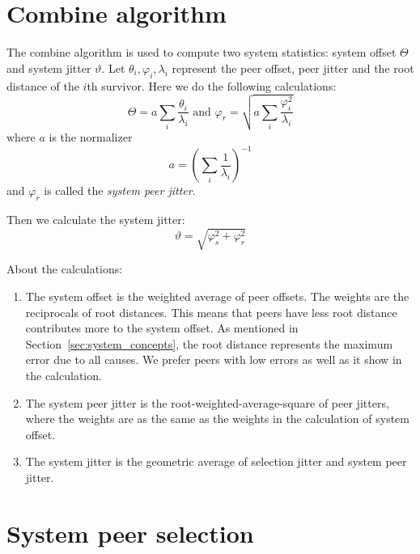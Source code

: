 \section{Combine algorithm}%
\label{sec:combine_algorithm}
The combine algorithm is used to compute two system statistics: system offset 
$\Theta$ and system jitter $\vartheta$. Let $\theta_i, \varphi_i, \lambda_i$
represent the peer offset, peer jitter and the root distance of the $i$th
survivor. Here we do the following calculations:~\cite{redbook}
\begin{equation}
    \Theta = a \sum^{}_{i} \frac{\theta_i}{\lambda_i} \text{ and } 
    \varphi_r = \sqrt{a \sum^{}_{i} \frac{\varphi_i ^ 2}{\lambda_i}}
    \label{eq:system_offset_selection_jitter}
\end{equation}
where $a$ is the normalizer
\begin{equation}
    a = \left( \sum^{}_{i} \frac{1}{\lambda_i} \right) ^ {-1}
    \label{eq:normalizer}
\end{equation}
and $\varphi_r$ is called the \emph{system peer jitter}.~\cite{rfc5905}

Then we calculate the system jitter:~\cite{redbook}
\begin{equation}
    \vartheta = \sqrt{\varphi_s^2 + \varphi_r^2}
    \label{eq:system_jitter}
\end{equation}

About the calculations:
\begin{enumerate}
    \item The system offset is the weighted average of peer offsets. The
        weights are the reciprocals of root distances. This means that peers
        have less root distance contributes more to the system offset. As
        mentioned in Section~\ref{sec:system_concepts}, the root distance
        represents the maximum error due to all causes. We prefer peers with
        low errors as well as it show in the calculation.
    \item The system peer jitter is the root-weighted-average-square of peer
        jitters, where the weights are as the same as the weights in the
        calculation of system offset.
    \item The system jitter is the geometric average of selection jitter and
        system peer jitter.
\end{enumerate}

\section{System peer selection}%
\label{sec:system_peer_selection}


